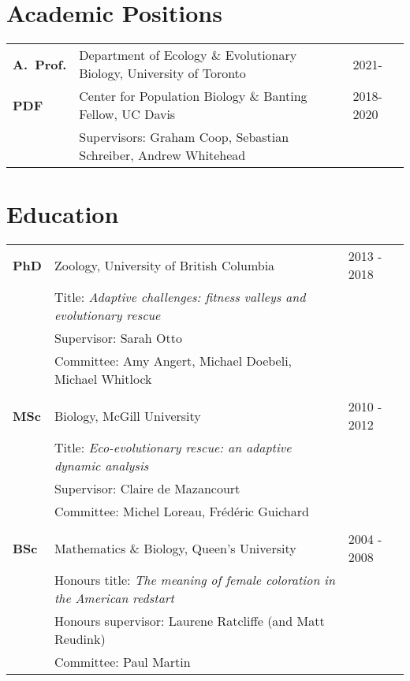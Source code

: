 \documentclass[12pt]{article}
\begin{document}

\section*{Academic Positions}

\begin{tabular}{lll}
\textbf{A.\ Prof.} & Department of Ecology \& Evolutionary Biology, University of Toronto & 2021-\\
\textbf{PDF} & Center for Population Biology \& Banting Fellow, UC Davis & 2018-2020\\
& Supervisors: Graham Coop, Sebastian Schreiber, Andrew Whitehead
\end{tabular}

\section*{Education}

\begin{tabular}{lll}
\textbf{PhD} & Zoology, University of British Columbia & 2013 - 2018\\
& Title: \textit{Adaptive challenges: fitness valleys and evolutionary rescue}\\
& Supervisor: Sarah Otto\\
& Committee: Amy Angert, Michael Doebeli, Michael Whitlock\\
\\
\textbf{MSc} & Biology, McGill University & 2010 - 2012 \\
& Title: \textit{Eco-evolutionary rescue: an adaptive dynamic analysis}  \\
& Supervisor: Claire de Mazancourt\\
& Committee: Michel Loreau, Fr\'{e}d\'{e}ric Guichard\\
\\
\textbf{BSc} &  Mathematics \& Biology, Queen's University & 2004 - 2008\\ %
& Honours title: \textit{The meaning of female coloration in the American redstart}  \\
& Honours supervisor: Laurene Ratcliffe (and Matt Reudink)\\
& Committee: Paul Martin\\
\end{tabular}
\end{document}
